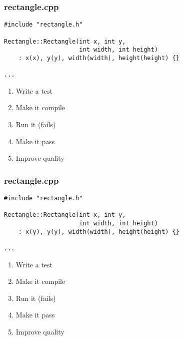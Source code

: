 \begin{frame}[fragile]
\frametitle{rectangle.cpp}
\begin{minipage}[t]{0.48\linewidth}
\begin{lstlisting}
#include "rectangle.h"

Rectangle::Rectangle(int x, int y, 
                     int width, int height)
    : x(x), y(y), width(width), height(height) {}

...
\end{lstlisting}
\end{minipage}\hfill
\begin{minipage}[t]{0.28\linewidth}
  \small
  \begin{enumerate} 
    \item \textcolor{activecolor}{Write a test}
    \item \textcolor{deadcolor}{Make it compile}
    \item \textcolor{deadcolor}{Run it (fails)}
    \item \textcolor{deadcolor}{Make it pass}
    \item \textcolor{deadcolor}{Improve quality}
  \end{enumerate} 
\end{minipage}
\end{frame}

\begin{frame}[fragile]
\frametitle{rectangle.cpp}
\begin{minipage}[t]{0.48\linewidth}
\begin{lstlisting}
#include "rectangle.h"

Rectangle::Rectangle(int x, int y, 
                     int width, int height)
    : x(y), y(y), width(width), height(height) {}

...
\end{lstlisting}
\end{minipage}\hfill
\begin{minipage}[t]{0.28\linewidth}
  \small
  \begin{enumerate} 
    \item \textcolor{activecolor}{Write a test}
    \item \textcolor{deadcolor}{Make it compile}
    \item \textcolor{deadcolor}{Run it (fails)}
    \item \textcolor{deadcolor}{Make it pass}
    \item \textcolor{deadcolor}{Improve quality}
  \end{enumerate} 
\end{minipage}
\end{frame}

